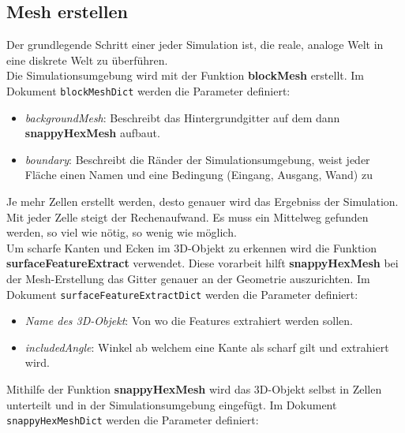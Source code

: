 \subsection{Mesh erstellen \label{openfoam:section:Mesh erstellen}}
Der grundlegende Schritt einer jeder Simulation ist, die reale, analoge Welt in eine diskrete Welt zu überführen.\\
Die Simulationsumgebung wird mit der Funktion \textbf{blockMesh} erstellt.
Im Dokument \texttt{blockMeshDict} werden die Parameter definiert:

\begin{itemize}
    \item \textit{backgroundMesh}: Beschreibt das Hintergrundgitter auf dem dann \textbf{snappyHexMesh} aufbaut.
    \item \textit{boundary}: Beschreibt die Ränder der Simulationsumgebung, weist jeder Fläche einen Namen und eine Bedingung (Eingang, Ausgang, Wand) zu
\end{itemize}

Je mehr Zellen erstellt werden, desto genauer wird das Ergebniss der Simulation.
Mit jeder Zelle steigt der Rechenaufwand.
Es muss ein Mittelweg gefunden werden, so viel wie nötig, so wenig wie möglich.\\

Um scharfe Kanten und Ecken im 3D-Objekt zu erkennen wird die Funktion \textbf{surfaceFeatureExtract} verwendet.
Diese vorarbeit hilft \textbf{snappyHexMesh} bei der Mesh-Erstellung das Gitter genauer an der Geometrie auszurichten.
Im Dokument \texttt{surfaceFeatureExtractDict} werden die Parameter definiert:

\begin{itemize}
    \item \textit{Name des 3D-Objekt}: Von wo die Features extrahiert werden sollen.
    \item \textit{includedAngle}: Winkel ab welchem eine Kante als scharf gilt und extrahiert wird.
\end{itemize}

Mithilfe der Funktion \textbf{snappyHexMesh} wird das 3D-Objekt selbst in  Zellen unterteilt und in der Simulationsumgebung eingefügt. 
Im Dokument \texttt{snappyHexMeshDict} werden die Parameter definiert:

